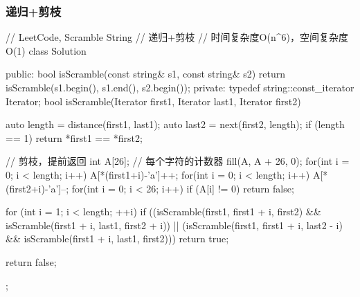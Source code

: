 \subsubsection{递归+剪枝}
\begin{Code}
// LeetCode, Scramble String
// 递归+剪枝
// 时间复杂度O(n^6)，空间复杂度O(1)
class Solution {
public:
    bool isScramble(const string& s1, const string& s2) {
        return isScramble(s1.begin(), s1.end(), s2.begin());
    }
private:
    typedef string::const_iterator Iterator;
    bool isScramble(Iterator first1, Iterator last1, Iterator first2) {
        auto length = distance(first1, last1);
        auto last2 = next(first2, length);
        if (length == 1) return *first1 == *first2;

        // 剪枝，提前返回
        int A[26]; // 每个字符的计数器
        fill(A, A + 26, 0);
        for(int i = 0; i < length; i++) A[*(first1+i)-'a']++;
        for(int i = 0; i < length; i++) A[*(first2+i)-'a']--;
        for(int i = 0; i < 26; i++) if (A[i] != 0) return false;

        for (int i = 1; i < length; ++i)
            if ((isScramble(first1, first1 + i, first2)
                 && isScramble(first1 + i, last1, first2 + i))
                    || (isScramble(first1, first1 + i, last2 - i)
                            && isScramble(first1 + i, last1, first2)))
                return true;

        return false;
    }
};
\end{Code}


